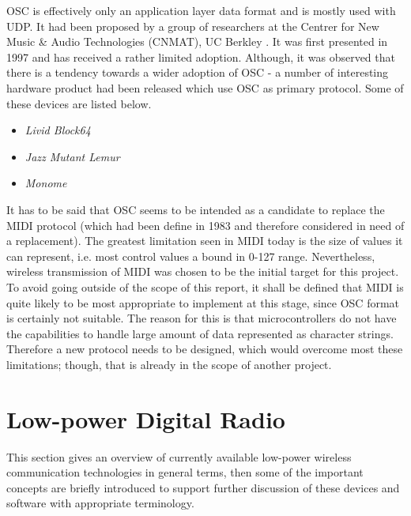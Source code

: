    OSC is effectively only an application layer data format and
  is mostly used with UDP. It had been proposed by a group of
  researchers at the Centrer for New Music \& Audio Technologies
  (CNMAT), UC Berkley \cite{links:cnmat}. It was first presented
  in 1997 \cite{paper:osc97} and has received a rather limited
  adoption. Although, it was observed that there is a tendency
  towards a wider adoption of OSC - a number of interesting
  hardware product had been released which use OSC as primary
  protocol. Some of these devices are listed below.

  \begin{itemize}
  	\item \emph{Livid Block64 \cite{links:livid:block64}}
	\item \emph{Jazz Mutant Lemur \cite{links:jazzmutant:lemur}}
	\item \emph{Monome \cite{links:monome}}
  \end{itemize}

  It has to be said that OSC seems to be intended as a candidate
  to replace the MIDI protocol (which had been define in 1983 and
  therefore considered in need of a replacement). The greatest
  limitation seen in MIDI today is the size of values it can
  represent, i.e. most control values a bound in 0-127 range.
  Nevertheless, wireless transmission of MIDI was chosen to
  be the initial target for this project. To avoid going
  outside of the scope of this report, it shall be defined
  that MIDI is quite likely to be most appropriate to implement
  at this stage, since OSC format is certainly not suitable.
  The reason for this is that microcontrollers do not have
  the capabilities to handle large amount of data represented
  as character strings. Therefore a new protocol needs to be
  designed, which would overcome most these limitations; though,
  that is already in the scope of another project.



\section{Low-power Digital Radio}

  This section gives an overview of currently available low-power
 wireless communication technologies in general terms, then some of
 the important concepts are briefly introduced to support further
 discussion of these devices and software with appropriate terminology.

